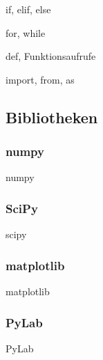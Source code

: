 \begin{frame}{if, elif, else}
\end{frame}

\begin{frame}{for, while}
\end{frame}

\begin{frame}{def, Funktionsaufrufe}
\end{frame}

\begin{frame}{import, from, as}
\end{frame}

\subsection{Bibliotheken}
\subsubsection{numpy}
\begin{frame}{numpy}
\end{frame}

\subsubsection{SciPy}
\begin{frame}{scipy}
\end{frame}

\subsubsection{matplotlib}
\begin{frame}{matplotlib}
\end{frame}

\subsubsection{PyLab}
\begin{frame}{PyLab}
\end{frame}
